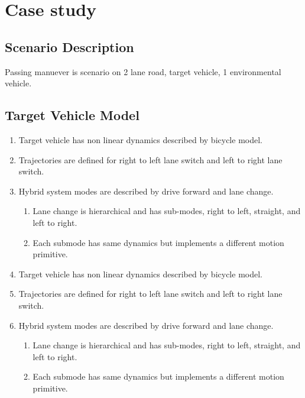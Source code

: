 \section{Case study}
\label{caseStudy}
\subsection{Scenario Description}
Passing manuever is scenario on 2 lane road, target vehicle, 1 environmental vehicle.
\subsection{Target Vehicle Model}
\begin{enumerate}
	\item Target vehicle has non linear dynamics described by bicycle model.
	\item Trajectories are defined for right to left lane switch and left to right lane switch.
	\item Hybrid system modes are described by drive forward and lane change.
	\begin{enumerate}
		\item Lane change is hierarchical and has sub-modes, right to left, straight, and left to right.
		\item Each submode has same dynamics but implements a different motion primitive.
	\end{enumerate}
	\item Target vehicle has non linear dynamics described by bicycle model.
	\item Trajectories are defined for right to left lane switch and left to right lane switch.
	\item Hybrid system modes are described by drive forward and lane change.
	\begin{enumerate}
		\item Lane change is hierarchical and has sub-modes, right to left, straight, and left to right.
		\item Each submode has same dynamics but implements a different motion primitive.
	\end{enumerate}
\end{enumerate}
